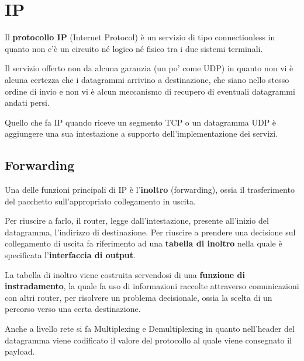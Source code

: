\section{IP}
Il \textbf{protocollo IP} (Internet Protocol) è un servizio di tipo 
connectionless in quanto non c'è un circuito né logico né fisico tra i
due sistemi terminali.

Il servizio offerto non da alcuna garanzia (un po' come UDP) in quanto 
non vi è alcuna certezza che i datagrammi arrivino a destinazione, che
siano nello stesso ordine di invio e non vi è alcun meccanismo di 
recupero di eventuali datagrammi andati persi.

Quello che fa IP quando riceve un segmento TCP o un datagramma UDP è
aggiungere una sua intestazione a supporto dell'implementazione dei
servizi.

\subsection{Forwarding}
Una delle funzioni principali di IP è l'\textbf{inoltro} (forwarding), 
ossia il trasferimento del pacchetto sull'appropriato collegamento in
uscita.

Per riuscire a farlo, il router, legge  dall'intestazione, presente 
all'inizio del datagramma, l'indirizzo di destinazione. Per riuscire 
a prendere una decisione sul collegamento di uscita fa riferimento ad 
una \textbf{tabella di inoltro} nella quale è specificata 
l'\textbf{interfaccia di output}.

La tabella di inoltro viene costruita servendosi di una
\textbf{funzione di instradamento}, la quale fa uso di informazioni
raccolte attraverso comunicazioni con altri router, per risolvere un
problema decisionale, ossia la scelta di un percorso verso una certa
destinazione.

Anche a livello rete si fa Multiplexing e Demultiplexing in quanto
nell'header del datagramma viene codificato il valore del protocollo 
al quale viene consegnato il payload.

